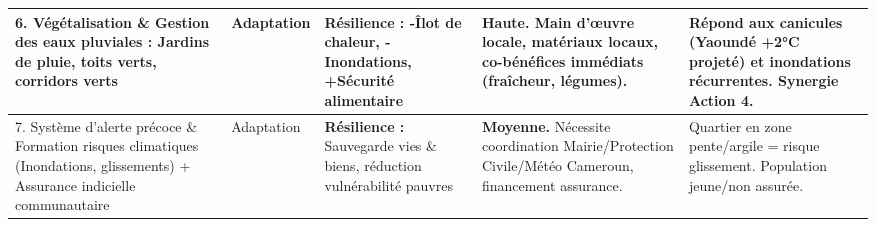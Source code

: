 \documentclass[11pt]{article}
\begin{document}
\begin{exoresolu}
\begin{center}
\begin{tabularx}{\linewidth}{|l|l|X|X|X|}
6. Végétalisation \& Gestion des eaux pluviales : Jardins de pluie, toits verts, corridors verts & Adaptation & \textbf{Résilience :} -Îlot de chaleur, -Inondations, +Sécurité alimentaire & \textbf{Haute.} Main d'œuvre locale, matériaux locaux, co-bénéfices immédiats (fraîcheur, légumes). & Répond aux canicules (Yaoundé +2°C projeté) et inondations récurrentes. Synergie Action 4. \\ \hline
7. Système d'alerte précoce \& Formation risques climatiques (Inondations, glissements) + Assurance indicielle communautaire & Adaptation & \textbf{Résilience :} Sauvegarde vies \& biens, réduction vulnérabilité pauvres & \textbf{Moyenne.} Nécessite coordination Mairie/Protection Civile/Météo Cameroun, financement assurance. & Quartier en zone pente/argile = risque glissement. Population jeune/non assurée. \\ \hline
\end{tabularx}
\end{center}


\end{exoresolu}
\end{document}
